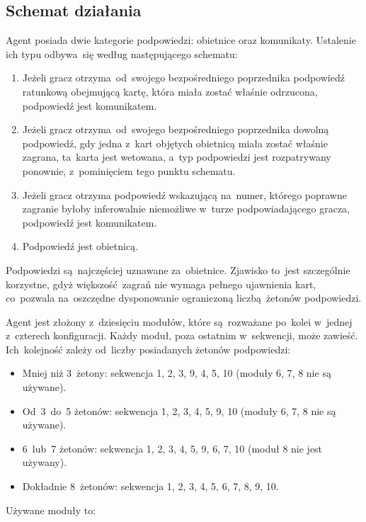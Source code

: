 \documentclass[declaration,shortabstract,inz]{iithesis}
\begin{document}
\subsection*{Schemat działania}

Agent posiada dwie kategorie podpowiedzi: obietnice oraz komunikaty. Ustalenie ich typu odbywa~się według następującego schematu:

\begin{enumerate}
	\item Jeżeli gracz otrzyma od~swojego bezpośredniego poprzednika podpowiedź ratunkową obejmującą kartę, która miała zostać właśnie odrzucona, podpowiedź jest komunikatem.
	\item Jeżeli gracz otrzyma od~swojego bezpośredniego poprzednika dowolną podpowiedź, gdy jedna z~kart objętych obietnicą miała zostać właśnie zagrana, ta~karta jest wetowana, a~typ podpowiedzi jest rozpatrywany ponownie, z~pominięciem tego punktu schematu.
	\item Jeżeli gracz otrzyma podpowiedź wskazującą na~numer, którego poprawne zagranie byłoby inferowalnie niemożliwe w~turze podpowiadającego gracza, podpowiedź jest komunikatem.
	\item Podpowiedź jest obietnicą.
\end{enumerate}

Podpowiedzi są~najczęściej uznawane za~obietnice. Zjawisko to~jest szczególnie korzystne, gdyż większość zagrań nie wymaga pełnego ujawnienia kart, co~pozwala na~oszczędne dysponowanie ograniczoną liczbą żetonów podpowiedzi.

Agent jest złożony z~dziesięciu modułów, które są~rozważane po~kolei w~jednej z~czterech konfiguracji. Każdy moduł, poza ostatnim w~sekwencji, może zawieść. Ich~kolejność zależy od~liczby posiadanych żetonów podpowiedzi:

\begin{itemize}
	\item Mniej niż 3~żetony: sekwencja 1, 2, 3, 9, 4, 5, 10 (moduły 6, 7, 8 nie są używane).
	\item Od~3~do~5 żetonów: sekwencja 1, 2, 3, 4, 5, 9, 10 (moduły 6, 7, 8 nie są używane).
	\item 6~lub~7 żetonów: sekwencja 1, 2, 3, 4, 5, 9, 6, 7, 10 (moduł 8 nie jest używany).
	\item Dokładnie 8~żetonów: sekwencja 1, 2, 3, 4, 5, 6, 7, 8, 9, 10.
\end{itemize}

\newpage
\noindent Używane moduły to:
\end{document}
